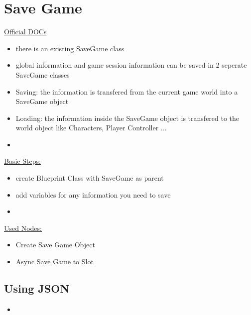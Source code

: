 \documentclass{scrbook}
\begin{document}
    \chapter{Save Game}
        \href{https://docs.unrealengine.com/4.27/en-US/InteractiveExperiences/SaveGame/}{Official DOCs}
        \begin{itemize}
            \item there is an existing SaveGame class
            \item global information and game session information can be saved in 2 seperate SaveGame classes
            \item Saving: the information is transfered from the current game world into a SaveGame object
            \item Loading: the information inside the SaveGame object is transfered to the world object like Characters, Player Controller ...
            \item 
        \end{itemize}
        \underline{Basic Steps:}
        \begin{itemize}
            \item create Blueprint Class with SaveGame as parent
            \item add variables for any information you need to save
            \item 
        \end{itemize}
        \underline{Used Nodes:}
        \begin{itemize}
            \item Create Save Game Object
            \item Async Save Game to Slot
        \end{itemize}

        \section{Using JSON}
            \begin{itemize}
                \item 
            \end{itemize}
\end{document}
